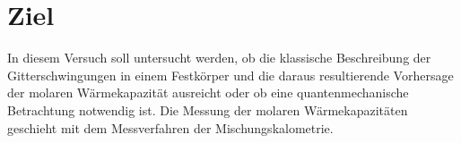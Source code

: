 \section{Ziel}
\label{sec:Ziel}
In diesem Versuch soll untersucht werden, ob die klassische Beschreibung der
Gitterschwingungen in einem Festkörper und die daraus resultierende Vorhersage
der molaren Wärmekapazität ausreicht oder ob eine quantenmechanische Betrachtung
notwendig ist. Die Messung der molaren Wärmekapazitäten geschieht mit dem Messverfahren
der Mischungskalometrie.

